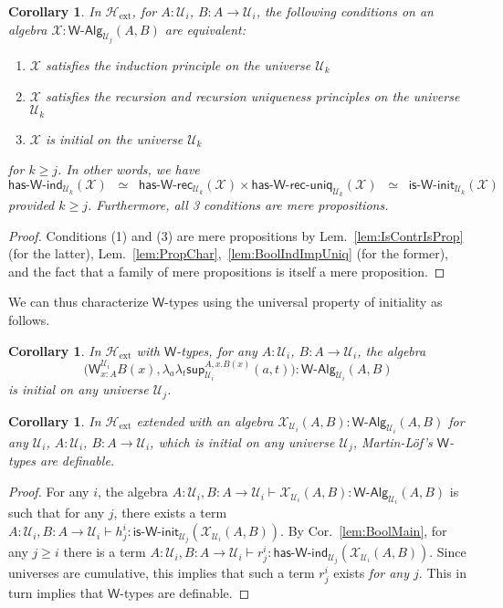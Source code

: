 \documentclass[11pt]{article}
\newcommand{\X}{\mathcal{X}}
\newcommand{\lam}[1]{\lambda_{#1}}
\newcommand{\W}{\mathsf{W}}
\newcommand{\wsup}{\mathsf{sup}}
\newcommand{\UU}{\mathcal{U}}
\newcommand{\WAlg}{\mathsf{W}\text{-}\mathsf{Alg}}
\newcommand{\HasWRec}{\mathsf{has}\text{-}\mathsf{W}\text{-}\mathsf{rec}}
\newcommand{\HasWInd}{\mathsf{has}\text{-}\mathsf{W}\text{-}\mathsf{ind}}
\newcommand{\HasWRecUniq}{\mathsf{has}\text{-}\mathsf{W}\text{-}\mathsf{rec}\text{-}\mathsf{uniq}}
\newcommand{\IsWInit}{\mathsf{is}\text{-}\mathsf{\W}\text{-}\mathsf{init}}
\newcommand{\Hext}{\mathcal{H}_{\mathrm{ext}}}
\newtheorem{corollary}[theorem]{Corollary}
\theoremstyle{definition}
\begin{document}
\begin{corollary}\label{lem:WMain}
In $\Hext$, for $A:\UU_i$, $B : A \to \UU_i$, the following conditions on an algebra $\X : \WAlg_{\UU_j}(A,B)$ are equivalent:
\begin{enumerate}
\item $\X$ satisfies the induction principle on the universe $\UU_k$
\item $\X$ satisfies the recursion and recursion uniqueness principles on the universe $\UU_k$
\item $\X$ is initial on the universe $\UU_k$  
\end{enumerate}
for $k \geq j$. In other words, we have \[ \HasWInd_{\UU_k}(\X)  \;\; \simeq \;\; \HasWRec_{\UU_k}(\X) \times \HasWRecUniq_{\UU_k}(\X) \;\; \simeq \;\; \IsWInit_{\UU_k}(\X) \]
provided $k \geq j$. Furthermore, all 3 conditions are mere propositions.
\end{corollary}
\begin{proof}
Conditions (1) and (3) are mere propositions by Lem.~\ref{lem:IsContrIsProp} (for the latter), Lem.~\ref{lem:PropChar},~\ref{lem:BoolIndImpUniq} (for the former), and the fact that a family of mere propositions is itself a mere proposition.
\end{proof}

We can thus characterize $\W$-types using the universal property of initiality as follows.
\begin{corollary}\label{lem:WInit}
In $\Hext$ with $\W$-types, for any $A:\UU_i$, $B : A \to \UU_i$, the algebra \[\Big(\W^{\UU_i}_{x:A}B(x),\lam{a}\lam{t} \wsup_{\UU_i}^{A,x.B(x)}(a,t) \Big) : \WAlg_{\UU_i}(A,B)\] is initial on any universe $\UU_j$.
\end{corollary}

\begin{corollary}\label{lem:WChar}
In $\Hext$ extended with an algebra $\X_{\UU_i}(A,B) : \WAlg_{\UU_i}(A,B)$ for any $\UU_i$, $A : \UU_i$, $B : A \to \UU_i$, which is initial on any universe $\UU_j$, Martin-L{\"o}f's $\W$-types are definable.
\end{corollary}
\begin{proof}
For any $i$, the algebra $A:\UU_i,B:A\to \UU_i \vdash \X_{\UU_i}(A,B) : \WAlg_{\UU_i}(A,B)$ is such that for any $j$, there exists a term $A:\UU_i,B:A\to \UU_i \vdash h^i_j  : \IsWInit_{\UU_j}(\X_{\UU_i}(A,B))$. By Cor.~\ref{lem:BoolMain}, for any $j \geq i$ there is a term $A:\UU_i,B:A\to \UU_i \vdash r^i_j : \HasWInd_{\UU_j}(\X_{\UU_i}(A,B))$. Since universes are cumulative, this implies that such a term $r^i_j$ exists \emph{for any $j$}. This in turn implies that $\W$-types are definable.
\end{proof}
\end{document}
